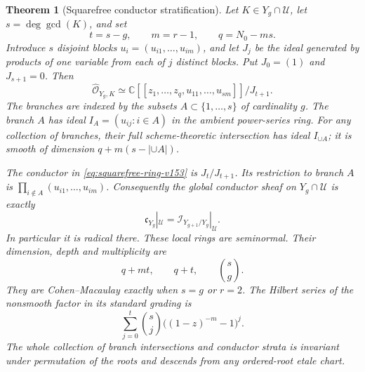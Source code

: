 \documentclass[11pt,reqno]{amsart}
\numberwithin{equation}{section}
\newtheorem{theorem}{Theorem}[section]
\theoremstyle{definition}\newtheorem{definition}[theorem]{Definition}
\theoremstyle{remark}\newtheorem{remark}[theorem]{Remark}
\newcommand{\C}{\mathbb C}\newcommand{\Q}{\mathbb Q}
\newcommand{\OO}{\mathcal O}\newcommand{\II}{\mathcal I}
\begin{document}
\begin{theorem}[Squarefree conductor stratification]
\label{thm:squarefree-v153}
Let $K\in Y_g\cap\mathcal U$, let $s=\deg\gcd(K)$, and set
\[
 t=s-g,\qquad m=r-1,\qquad q=N_0-ms.
\]
Introduce $s$ disjoint blocks $u_i=(u_{i1},\ldots,u_{im})$, and let
$J_j$ be the ideal generated by products of one variable from each of
$j$ distinct blocks. Put $J_0=(1)$ and $J_{s+1}=0$. Then
\begin{equation}\label{eq:squarefree-ring-v153}
 \widehat{\OO}_{Y_g,K}\simeq
 \C[[z_1,\ldots,z_q,u_{11},\ldots,u_{sm}]]/J_{t+1}.
\end{equation}
The branches are indexed by the subsets $A\subset\{1,\ldots,s\}$
of cardinality $g$. The branch $A$ has ideal
$I_A=(u_{ij}:i\in A)$ in the ambient power-series ring. For any
collection of branches, their full scheme-theoretic intersection has
ideal $I_{\cup A}$; it is smooth of dimension
$q+m(s-|\cup A|)$.

The conductor in \eqref{eq:squarefree-ring-v153} is $J_t/J_{t+1}$.
Its restriction to branch $A$ is
$\prod_{i\notin A}(u_{i1},\ldots,u_{im})$. Consequently the global
conductor sheaf on $Y_g\cap\mathcal U$ is exactly
\begin{equation}\label{eq:global-conductor-v153}
 \mathfrak c_{Y_g}|_{\mathcal U}
        =\II_{Y_{g+1}/Y_g}|_{\mathcal U}.
\end{equation}
In particular it is radical there. These local rings are seminormal.
Their dimension, depth and multiplicity are
\[
 q+mt,\qquad q+t,\qquad \binom{s}{g}.
\]
They are Cohen--Macaulay exactly when $s=g$ or $r=2$.
The Hilbert series of the nonsmooth factor in its standard grading is
\begin{equation}\label{eq:block-hilbert-v153}
 \sum_{j=0}^{t}\binom{s}{j}\bigl((1-z)^{-m}-1\bigr)^j.
\end{equation}
The whole collection of branch intersections and conductor strata
is invariant under permutation of the roots and descends from any
ordered-root etale chart.
\end{theorem}
\end{document}
